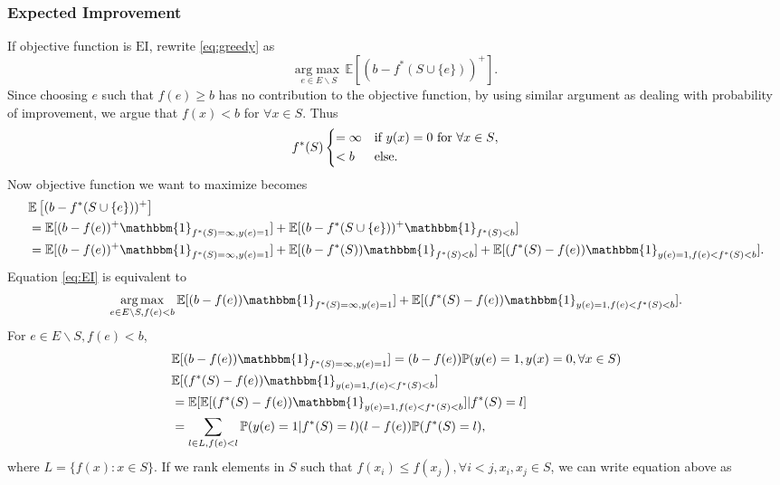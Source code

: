 \documentclass[11pt]{article}
\newcommand{\E}{\mathbb{E}}
\newcommand{\EI}{\mathrm{EI}}
\begin{document}
\subsubsection{Expected Improvement}
If objective function is $\EI$, rewrite \eqref{eq:greedy} as 
\begin{equation} \label{eq:EI}
\underset{e \in E \backslash S}{\mathrm{arg}\max} \, \E \left[ (b-f^*(S \cup \{e\}))^+ \right].
\end{equation}
Since choosing $e$ such that $f(e) \geq b$ has no contribution to the objective function, by using similar argument as dealing with probability of improvement, we argue that $f(x)<b$ for $\forall x \in S$. Thus
\begin{equation*}
f^*(S)  \begin{dcases}
         =\infty & \text{if $y(x)=0$ for $\forall x \in S$},\\
         < b & \text{else}.
 \end{dcases}
\end{equation*}
Now objective function we want to maximize becomes
\begin{align*}
&\E \left[ (b-f^*(S \cup \{e\}))^+ \right] \\
&= \E[(b-f(e))^+ \mathbbm{1}_{f^*(S)=\infty, y(e)=1}]+ \E[ (b-f^*(S \cup \{e\}))^+ \mathbbm{1}_{f^*(S)<b}] \\
&= \E[(b-f(e))^+ \mathbbm{1}_{f^*(S)=\infty, y(e)=1}]+ \E[ (b-f^*(S)) \mathbbm{1}_{f^*(S)<b}] + \E[(f^*(S)-f(e)) \mathbbm{1}_{y(e)=1, f(e)<f^*(S)<b}].
\end{align*}
Equation \eqref{eq:EI} is equivalent to 
\begin{equation} \label{eq:EI2}
\underset{e \in E \backslash S, f(e)<b}{\mathrm{arg}\max} \, \E[(b-f(e)) \mathbbm{1}_{f^*(S)=\infty, y(e)=1}]+\E[(f^*(S)-f(e)) \mathbbm{1}_{y(e)=1, f(e)<f^*(S)<b}].
\end{equation}
For $e \in E \backslash S, f(e)<b$,
\begin{align*}
&\E[(b-f(e)) \mathbbm{1}_{f^*(S)=\infty, y(e)=1}] = (b-f(e)) \mathbb{P}(y(e)=1, y(x)=0, \forall x \in S)\\
&\E[(f^*(S)-f(e)) \mathbbm{1}_{y(e)=1, f(e)<f^*(S)<b}]\\
&=\E[\E[(f^*(S)-f(e)) \mathbbm{1}_{y(e)=1, f(e)<f^*(S)<b}]|f^*(S)=l]\\
&= \sum_{l \in L, f(e)<l} \mathbb{P}(y(e)=1|f^*(S)=l)(l-f(e))\mathbb{P}(f^*(S)=l),\\
\end{align*}
where $L = \{f(x): x \in S\}$. If we rank elements in $S$ such that $f(x_i) \leq f(x_j), \forall i<j, x_i,x_j \in S$, we can write equation above as
\end{document}
